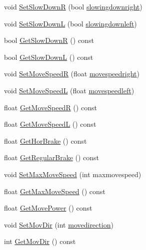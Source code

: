 \begin{DoxyCompactItemize}
\item 
void \hyperlink{classPrincessObject_aec424f4e58610f68d67da368b6489829}{Set\+Slow\+DownR} (bool \hyperlink{classPrincessObject_a1898fcebf9a59d2c445b44f46f3651aa}{slowingdownright})
\item 
void \hyperlink{classPrincessObject_ade14bf665247079cd377f7c076c0b565}{Set\+Slow\+DownL} (bool \hyperlink{classPrincessObject_a48ad71b9b57a16ca7fc293b915030427}{slowingdownleft})
\item 
bool \hyperlink{classPrincessObject_a38ebdc7ff101545332bf4c72d8798426}{Get\+Slow\+DownR} () const 
\item 
bool \hyperlink{classPrincessObject_acdc3e17a308e8d8db90e3f5bd50f8000}{Get\+Slow\+DownL} () const 
\item 
void \hyperlink{classPrincessObject_a97c2327c522177ea77435b97fdd8b956}{Set\+Move\+SpeedR} (float \hyperlink{classPrincessObject_aa36726b24708bce76574c43fdd281d4f}{movespeedright})
\item 
void \hyperlink{classPrincessObject_aef458b811eeb6472d7f434a09c9ed740}{Set\+Move\+SpeedL} (float \hyperlink{classPrincessObject_a079a33404f9353bb1da4b7d56bbdb23f}{movespeedleft})
\item 
float \hyperlink{classPrincessObject_a084245be26f1d64b6842901397f834c2}{Get\+Move\+SpeedR} () const 
\item 
float \hyperlink{classPrincessObject_a10f0fd59ffaadb4fd04195736f62dff0}{Get\+Move\+SpeedL} () const 
\item 
float \hyperlink{classPrincessObject_ab390bfcd5cceb12f57ddc43992304438}{Get\+Hor\+Brake} () const 
\item 
float \hyperlink{classPrincessObject_a556c230fb317aa92484b6f3831b5e11e}{Get\+Regular\+Brake} () const 
\item 
void \hyperlink{classPrincessObject_ae431ef4231de303a4cb755e03eb68666}{Set\+Max\+Move\+Speed} (int maxmovespeed)
\item 
float \hyperlink{classPrincessObject_a081c601d2f5b84ce5f823b205589e182}{Get\+Max\+Move\+Speed} () const 
\item 
float \hyperlink{classPrincessObject_a2fa4d2d464ef3883f2158bbc93a4d757}{Get\+Move\+Power} () const 
\item 
void \hyperlink{classPrincessObject_a536f5945b6202535fd210663f335d835}{Set\+Mov\+Dir} (int \hyperlink{classPrincessObject_a15438cd744677b00661e1e13165f44fb}{movedirection})
\item 
int \hyperlink{classPrincessObject_af0d38acf6140b652a40471efa01c3660}{Get\+Mov\+Dir} () const 

\end{DoxyCompactItemize}
